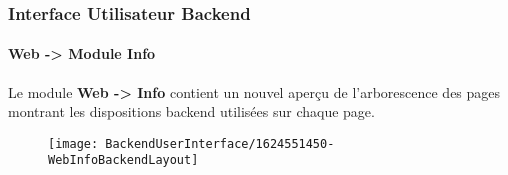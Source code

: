 %

\begin{frame}[fragile]
	\frametitle{Interface Utilisateur Backend}
	\framesubtitle{Web -> Module Info}

	Le module \textbf{Web -> Info} contient un nouvel aperçu de l'arborescence des pages
	montrant les dispositions backend utilisées sur chaque page.

	\begin{figure}
		\texttt{[image: BackendUserInterface/1624551450-WebInfoBackendLayout]}
	\end{figure}

\end{frame}

